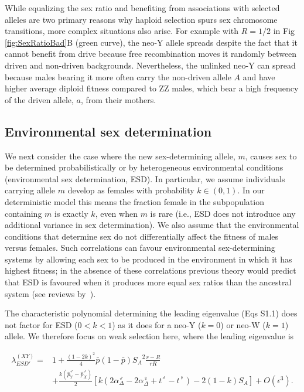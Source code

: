 \documentclass[10pt,letterpaper]{article}
\begin{document}
While equalizing the sex ratio and benefiting from associations with selected alleles are two primary reasons why haploid selection spurs sex chromosome transitions, more complex situations also arise.  
For example with $R=1/2$ in Fig \ref{fig:SexRatioBad}B (green curve), the neo-Y allele spreads despite the fact that it cannot benefit from drive because free recombination moves it randomly between driven and non-driven backgrounds.  
Nevertheless, the unlinked neo-Y can spread because males bearing it more often carry the non-driven allele $A$ and have higher average diploid fitness compared to ZZ males, which bear a high frequency of the driven allele, $a$, from their mothers.

\subsection*{Environmental sex determination}

We next consider the case where the new sex-determining allele, $m$, causes sex to be determined probabilistically or by heterogeneous environmental conditions (environmental sex determination, ESD).
In particular, we assume individuals carrying allele $m$ develop as females with probability $k\in(0,1)$.
In our deterministic model this means the fraction female in the subpopulation containing $m$ is exactly $k$, even when $m$ is rare (i.e., ESD does not introduce any additional variance in sex determination). 
We also assume that the environmental conditions that determine sex do not differentially affect the fitness of males versus females. 
Such correlations can favour environmental sex-determining systems by allowing each sex to be produced in the environment in which it has highest fitness; in the absence of these correlations previous theory would predict that ESD is favoured when it produces more equal sex ratios than the ancestral system (see reviews by~\cite{Charnov:1982wg,Bull:1983vi,West:2009we}). 

The characteristic polynomial determining the leading eigenvalue (Eqs S1.1) does not factor for ESD ($0<k<1$) as it does for a neo-Y ($k=0$) or neo-W ($k=1$) allele. 
We therefore focus on weak selection here, where the leading eigenvalue is

\begin{equation}
\begin{split}
\lambda_{ESD'}^{(XY)} =& 1 + \frac{{(1-2k)}^2}{4}\bar{p}(1-\bar{p}){S_{A}}^2\frac{r-R}{r R} \\
&+\frac{k(\hat{p}^\male_Y-\hat{p}^\male_X)}{2}\left[ k \left(2\alpha_{\Delta}^\male-2\alpha_{\Delta}^\female+t^\male-t^\female \right) -2(1-k)S_{A}\right]+O\left(\epsilon^3\right).
\end{split}
\label{eq:lambda_ESD_k}
\end{equation}
\end{document}
